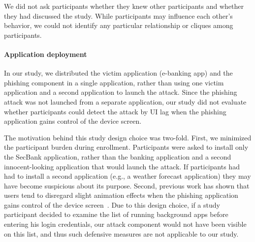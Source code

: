 We did not ask participants whether they knew other participants and whether they had discussed the study.
While participants may influence each other's behavior, we could not identify any particular relationship or cliques among participants.


\paragraph{Application deployment}
In our study, we distributed the victim application (e-banking app) and the phishing component in a single application, rather than using one victim application and a second application to launch the attack.
Since the phishing attack was not launched from a separate application, our study did not evaluate whether participants could detect the attack by UI lag when the phishing application gains control of the device screen.

The motivation behind this study design choice was two-fold.
First, we minimized the participant burden during enrollment. Participants were asked to install only the SecBank application, rather than the banking application and a second innocent-looking application that would launch the attack.
If participants had had to install a second application (e.g., a weather forecast application) they may have become suspicious about its purpose.
Second, previous work has shown that 
users tend to disregard slight animation effects when the phishing application gains control of the device screen~\cite{bianchi15sp}. %
Due to this design choice, if a study participant decided to examine the list of running background apps before entering his login credentials, our attack component would not have been visible on this list, and thus such defensive measures are not applicable to our study.

